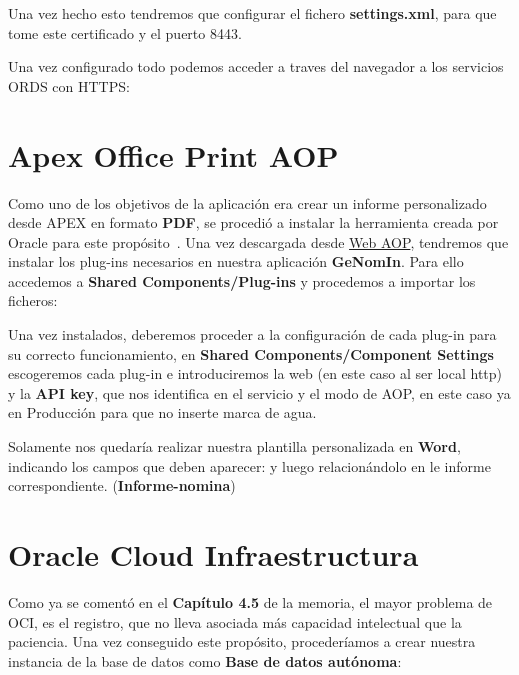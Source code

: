 Una vez hecho esto tendremos que configurar el fichero \textbf{settings.xml}, para que tome este certificado y el puerto 8443.

Una vez configurado todo podemos acceder a traves del navegador a los servicios \acrshort{ORDS} con \acrshort{HTTPS}:

\section{Apex Office Print AOP}

Como uno de los objetivos de la aplicación era crear un informe personalizado desde \acrshort{APEX} en formato \textbf{PDF}, se procedió a instalar la herramienta creada por Oracle para este propósito~\cite{OverviewAPEXOffice}.
Una vez descargada desde \href{https://www.apexofficeprint.com/}{Web AOP}, tendremos que instalar los plug-ins necesarios en nuestra aplicación \textbf{GeNomIn}. Para ello accedemos a \textbf{Shared Components/Plug-ins} y procedemos a importar los ficheros:

Una vez instalados, deberemos proceder a la configuración de cada plug-in para su correcto funcionamiento, en \textbf{Shared Components/Component Settings} escogeremos cada plug-in e introduciremos la web (en este caso al ser local http) y la \textbf{API key}, que nos identifica en el servicio y el modo de AOP, en este caso ya en Producción para que no inserte marca de agua.

Solamente nos quedaría realizar nuestra plantilla personalizada en \textbf{Word}, indicando los campos que deben aparecer:
y luego relacionándolo en le informe correspondiente. (\textbf{Informe-nomina})

\section{Oracle Cloud Infraestructura}
Como ya se comentó en el \textbf{Capítulo 4.5} de la memoria, el mayor problema de \acrshort{OCI}, es el registro, que no lleva asociada más capacidad intelectual que la paciencia.
Una vez conseguido este propósito, procederíamos a crear nuestra instancia de la base de datos como \textbf{Base de datos autónoma}:

